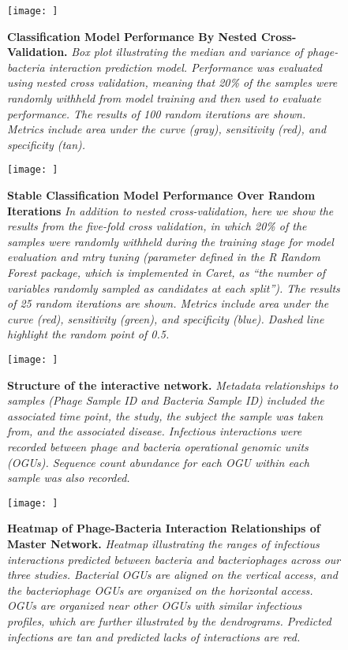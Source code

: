 \documentclass[12pt,]{article}
\begin{document}
\newpage

\begin{figure}[htbp]
\centering
\texttt{[image: ]}
\caption{\textbf{Classification Model Performance By Nested
Cross-Validation.} \emph{Box plot illustrating the median and variance
of phage-bacteria interaction prediction model. Performance was
evaluated using nested cross validation, meaning that 20\% of the
samples were randomly withheld from model training and then used to
evaluate performance. The results of 100 random iterations are shown.
Metrics include area under the curve (gray), sensitivity (red), and
specificity (tan).}\label{nestedperformance}}
\end{figure}

\newpage

\begin{figure}[htbp]
\centering
\texttt{[image: ]}
\caption{\textbf{Stable Classification Model Performance Over Random
Iterations} \emph{In addition to nested cross-validation, here we show
the results from the five-fold cross validation, in which 20\% of the
samples were randomly withheld during the training stage for model
evaluation and mtry tuning (parameter defined in the R Random Forest
package, which is implemented in Caret, as ``the number of variables
randomly sampled as candidates at each split''). The results of 25
random iterations are shown. Metrics include area under the curve (red),
sensitivity (green), and specificity (blue). Dashed line highlight the
random point of 0.5.}\label{crossval}}
\end{figure}

\newpage

\begin{figure}[htbp]
\centering
\texttt{[image: ]}
\caption{\textbf{Structure of the interactive network.} \emph{Metadata
relationships to samples (Phage Sample ID and Bacteria Sample ID)
included the associated time point, the study, the subject the sample
was taken from, and the associated disease. Infectious interactions were
recorded between phage and bacteria operational genomic units (OGUs).
Sequence count abundance for each OGU within each sample was also
recorded.}\label{NetworkDiagram}}
\end{figure}

\newpage

\begin{figure}[htbp]
\centering
\texttt{[image: ]}
\caption{\textbf{Heatmap of Phage-Bacteria Interaction Relationships of
Master Network.} \emph{Heatmap illustrating the ranges of infectious
interactions predicted between bacteria and bacteriophages across our
three studies. Bacterial OGUs are aligned on the vertical access, and
the bacteriophage OGUs are organized on the horizontal access. OGUs are
organized near other OGUs with similar infectious profiles, which are
further illustrated by the dendrograms. Predicted infections are tan and
predicted lacks of interactions are red.}\label{inthm}}
\end{figure}
\end{document}
